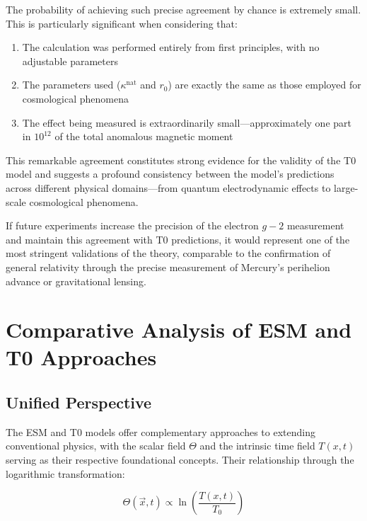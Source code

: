 \documentclass[12pt,a4paper]{article}
\newcommand{\Tfieldt}{T(x,t)}
\newcommand{\Tzero}{T_0}
\newcommand{\vecx}{\vec{x}}
\begin{document}
	The probability of achieving such precise agreement by chance is extremely small. This is particularly significant when considering that:
	
	\begin{enumerate}
		\item The calculation was performed entirely from first principles, with no adjustable parameters
		
		\item The parameters used ($\kappa^{\text{nat}}$ and $r_0$) are exactly the same as those employed for cosmological phenomena
		
		\item The effect being measured is extraordinarily small—approximately one part in $10^{12}$ of the total anomalous magnetic moment
	\end{enumerate}
	
	This remarkable agreement constitutes strong evidence for the validity of the T0 model and suggests a profound consistency between the model's predictions across different physical domains—from quantum electrodynamic effects to large-scale cosmological phenomena.
	
	If future experiments increase the precision of the electron $g-2$ measurement and maintain this agreement with T0 predictions, it would represent one of the most stringent validations of the theory, comparable to the confirmation of general relativity through the precise measurement of Mercury's perihelion advance or gravitational lensing.
	
	\section{Comparative Analysis of ESM and T0 Approaches}
	\label{sec:comparison}
	
	\subsection{Unified Perspective}
	\label{subsec:unified_perspective}
	
	The ESM and T0 models offer complementary approaches to extending conventional physics, with the scalar field $\Theta$ and the intrinsic time field $\Tfieldt$ serving as their respective foundational concepts. Their relationship through the logarithmic transformation:
	
	\begin{equation}
		\Theta(\vecx,t) \propto \ln\left(\frac{\Tfieldt}{\Tzero}\right)
		\label{eq:log_transform}
	\end{equation}
	
\end{document}
